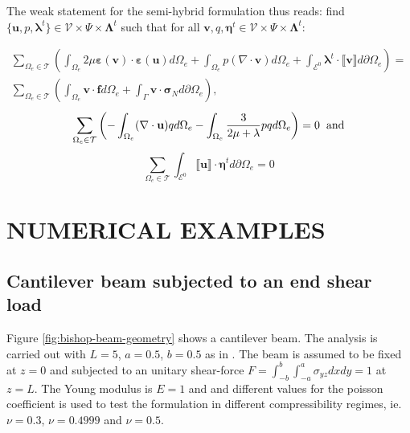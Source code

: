 \documentclass{wccm2024}
\begin{document}
The weak statement for the semi-hybrid formulation thus reads: find $\{\mathbf{u},p,\boldsymbol{\lambda}^t\} \in \mathcal{V} \times \Psi \times \boldsymbol{\Lambda}^t$ such that for all $\mathbf{v},q,\boldsymbol{\eta}^t \in \mathcal{V}\times \Psi \times \boldsymbol{\Lambda}^t$:

\begin{equation} \label{eq:semihybrid1}
    \begin{split}
        \sum_{\Omega_e \in \mathcal{T}} \left( \int_{\Omega_e} 2\mu\boldsymbol{\varepsilon}(\mathbf{v}) \cdot \boldsymbol{\varepsilon}(\mathbf{u}) d\Omega_e + \int_{\Omega_e} p (\nabla \cdot \mathbf{v}) d\Omega_e + \int_{\mathcal{E}^0} \boldsymbol{\lambda}^t \cdot \llbracket \mathbf{v} \rrbracket d\partial\Omega_e \right) = \\ \sum_{\Omega_e \in \mathcal{T}} \left( \int_{\Omega_e} \mathbf{v} \cdot \mathbf{f} d\Omega_e + \int_{\Gamma} \mathbf{v} \cdot \boldsymbol{\sigma}_N d\partial\Omega_e \right) \text{,}
    \end{split}
\end{equation}
\begin{equation} \label{eq:semihybrid2}
    \sum_{\Omega_e \in \mathcal{T}} \left(-\int_{\Omega_e} (\nabla \cdot \mathbf{u}) q d\Omega_e -\int_{\Omega_e} \frac{3}{2\mu+\lambda}p q d\Omega_e \right) = 0 \hspace{.2cm} \text{and}
\end{equation}
\begin{equation} \label{eq:semihybrid3}
    \sum_{\Omega_e \in \mathcal{T}} \int_{\mathcal{E}^0} \llbracket \mathbf{u} \rrbracket \cdot \mathbf{\eta}^t d\partial\Omega_e = 0
\end{equation}

\section{NUMERICAL EXAMPLES}

\subsection{Cantilever beam subjected to an end shear load \label{subsec:bishop}}

Figure \ref{fig:bishop-beam-geometry} shows a cantilever beam. The analysis is carried out with $L=5$, $a=0.5$, $b=0.5$ as in \cite{bishop2014displacement}. The beam is assumed to be fixed at $z=0$ and subjected to an unitary shear-force $F=\int_{-b}^{b}\int_{-a}^{a}\sigma_{yz}dxdy=1$ at $z=L$. The Young modulus is $E=1$ and and different values for the poisson coefficient is used to test the formulation in different compressibility regimes, ie. $\nu=0.3$, $\nu=0.4999$ and $\nu=0.5$.
\end{document}
